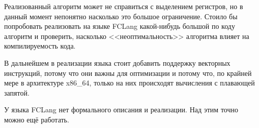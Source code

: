 \documentclass[a4paper,14pt]{extarticle}
\begin{document}
Реализованный алгоритм может не справиться с выделением регистров, но в данный момент непонятно насколько это большое ограничение.
Стоило бы попробовать реализовать на языке FCLang какой-нибудь большой по коду алгоритм и проверить,
насколько <<неоптимальность>> алгоритма влияет на компилируемость кода.

В дальнейшем в реализации языка стоит добавить поддержку векторных инструкций,
потому что они важны для оптимизации и потому что, по крайней мере в архитектуре x86\_64,
только на них происходят вычисления с плавающей запятой.

У языка FCLang нет формального описания и реализации.
Над этим точно можно ещё работать.

\newpage



\end{document}
